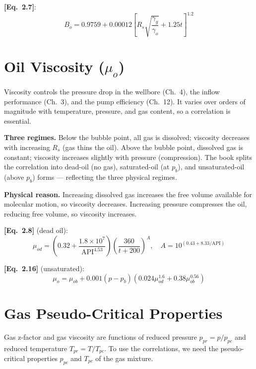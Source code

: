 \documentclass[11pt,a4paper,openany]{book}
\newcommand{\eqrefbook}[1]{\textcolor{blue!60!black}{\textbf{[Eq.~#1]}}}
\begin{document}
\eqrefbook{2.7}:
\begin{equation}
  B_o = 0.9759 + 0.00012\left[
    R_s\sqrt{\frac{\gamma_g}{\gamma_o}} + 1.25 t
  \right]^{1.2}
\end{equation}

\section{Oil Viscosity ($\mu_o$)}

\begin{purpose}
Viscosity controls the pressure drop in the wellbore (Ch.~4), the
inflow performance (Ch.~3), and the pump efficiency (Ch.~12). It
varies over orders of magnitude with temperature, pressure, and gas
content, so a correlation is essential.
\end{purpose}

\begin{theory}
\textbf{Three regimes.} Below the bubble point, all gas is dissolved;
viscosity decreases with increasing $R_s$ (gas thins the oil). Above
the bubble point, dissolved gas is constant; viscosity increases
slightly with pressure (compression). The book splits the correlation
into dead-oil (no gas), saturated-oil (at $p_b$), and
unsaturated-oil (above $p_b$) forms — reflecting the three physical
regimes.

\textbf{Physical reason.} Increasing dissolved gas increases the
free volume available for molecular motion, so viscosity decreases.
Increasing pressure compresses the oil, reducing free volume, so
viscosity increases.
\end{theory}

\eqrefbook{2.8} (dead oil):
\begin{equation}
  \mu_{od} = \left(0.32 + \frac{1.8\times 10^7}{\mathrm{API}^{4.53}}
  \right)\left(\frac{360}{t + 200}\right)^{A},\quad
  A = 10^{(0.43 + 8.33/\mathrm{API})}
\end{equation}

\eqrefbook{2.16} (unsaturated):
\begin{equation}
  \mu_o = \mu_{ob} + 0.001(p - p_b)\left(0.024\mu_{od}^{1.6}
        + 0.38\mu_{ob}^{0.56}\right)
\end{equation}

\section{Gas Pseudo-Critical Properties}

\begin{purpose}
Gas z-factor and gas viscosity are functions of reduced pressure
$p_{pr} = p/p_{pc}$ and reduced temperature $T_{pr} = T/T_{pc}$. To
use the correlations, we need the pseudo-critical properties $p_{pc}$
and $T_{pc}$ of the gas mixture.
\end{purpose}
\end{document}
